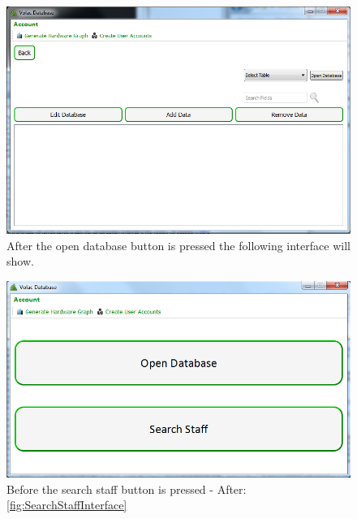 \begin{figure}[H]
    \includegraphics[width=\textwidth]{./Testing/Images/OpenDatabaseInterface.png}
    \caption{After the open database button is pressed the following interface will show.} \label{fig:OpenDatabaseInterface}
\end{figure}

\begin{figure}[H]
    \includegraphics[width=\textwidth]{./Testing/Images/AdminInterface.png}
    \caption{Before the search staff button is pressed - After:\ref{fig:SearchStaffInterface}} \label{fig:SearchStaffInterfaceBF}
\end{figure}

